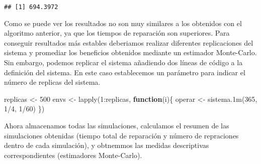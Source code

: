 \documentclass[
]{book}
\newenvironment{Shaded}{\begin{snugshade}}{\end{snugshade}}
\newcommand{\ControlFlowTok}[1]{\textcolor[rgb]{0.13,0.29,0.53}{\textbf{#1}}}
\newcommand{\DecValTok}[1]{\textcolor[rgb]{0.00,0.00,0.81}{#1}}
\newcommand{\FunctionTok}[1]{\textcolor[rgb]{0.00,0.00,0.00}{#1}}
\newcommand{\NormalTok}[1]{#1}
\newcommand{\OtherTok}[1]{\textcolor[rgb]{0.56,0.35,0.01}{#1}}
\newcommand{\SpecialCharTok}[1]{\textcolor[rgb]{0.00,0.00,0.00}{#1}}
\theoremstyle{definition}
\theoremstyle{definition}
\theoremstyle{definition}
\theoremstyle{definition}
\theoremstyle{remark}
\begin{document}
\begin{verbatim}
## [1] 694.3972
\end{verbatim}

Como se puede ver los resultados no son muy similares a los obtenidos con el algoritmo anterior, ya que los tiempos de reparación son superiores. Para conseguir resultados más estables deberiamos realizar diferentes replicaciones del sistema y promediar los beneficios obtenidos mediante un estimador Monte-Carlo. Sin embargo, podemos replicar el sistema añadiendo dos líneas de código a la definición del sistema. En este caso establecemos un parámetro para indicar el número de replicas del sistema.

\begin{Shaded}
\begin{Highlighting}[]
\NormalTok{replicas }\OtherTok{\textless{}{-}} \DecValTok{500}
\NormalTok{envs }\OtherTok{\textless{}{-}} \FunctionTok{lapply}\NormalTok{(}\DecValTok{1}\SpecialCharTok{:}\NormalTok{replicas, }\ControlFlowTok{function}\NormalTok{(i)\{}
\NormalTok{  operar }\OtherTok{\textless{}{-}} \FunctionTok{sistema.1m}\NormalTok{(}\DecValTok{365}\NormalTok{, }\DecValTok{1}\SpecialCharTok{/}\DecValTok{4}\NormalTok{, }\DecValTok{1}\SpecialCharTok{/}\DecValTok{60}\NormalTok{)}
\NormalTok{\})}
\end{Highlighting}
\end{Shaded}

Ahora almacenamos todas las simulaciones, calculamos el resumen de las simulaciones obtenidas (tiempo total de reparación y número de repraciones dentro de cada simulación), y obtnemmos las medidas descriptivas correspondientes (estimadores Monte-Carlo).
\end{document}
